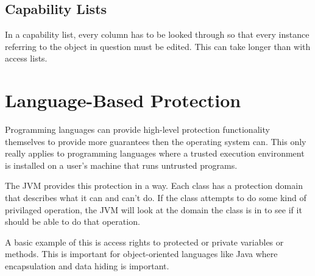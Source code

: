 \documentclass{article}
\begin{document}
\subsection{Capability Lists}

In a capability list, every column has to be looked through so that every
instance referring to the object in question must be edited. This can take
longer than with access lists.

\section{Language-Based Protection}

Programming languages can provide high-level protection functionality themselves
to provide more guarantees then the operating system can. This only really
applies to programming languages where a trusted execution environment is
installed on a user's machine that runs untrusted programs.

The JVM provides this protection in a way. Each class has a protection domain
that describes what it can and can't do. If the class attempts to do some kind
of privilaged operation, the JVM will look at the domain the class is in to see
if it should be able to do that operation.

A basic example of this is access rights to protected or private variables or
methods. This is important for object-oriented languages like Java where
encapsulation and data hiding is important.
\end{document}

